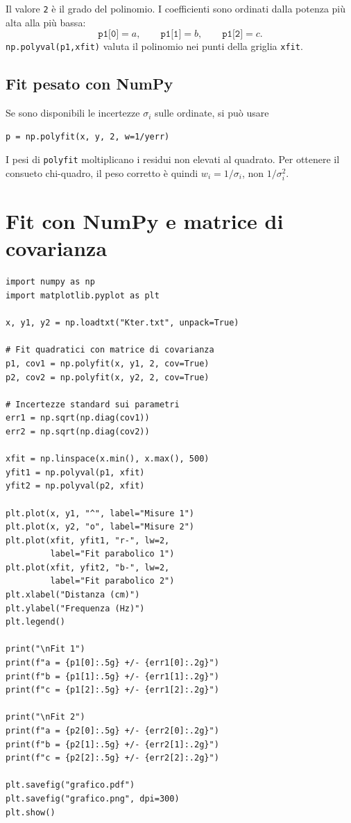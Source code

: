 \documentclass[11pt,a4paper]{book}
\begin{document}
Il valore \texttt{2} è il grado del polinomio. I coefficienti sono ordinati dalla potenza più alta alla più bassa:
\[
 \texttt{p1[0]}=a,\qquad
 \texttt{p1[1]}=b,\qquad
 \texttt{p1[2]}=c.
\]
\texttt{np.polyval(p1,xfit)} valuta il polinomio nei punti della griglia \texttt{xfit}.

\subsection{Fit pesato con NumPy}
Se sono disponibili le incertezze $\sigma_i$ sulle ordinate, si può usare
\begin{lstlisting}
p = np.polyfit(x, y, 2, w=1/yerr)
\end{lstlisting}
I pesi di \texttt{polyfit} moltiplicano i residui non elevati al quadrato. Per ottenere il consueto chi-quadro, il peso corretto è quindi $w_i=1/\sigma_i$, non $1/\sigma_i^2$.

\section{Fit con NumPy e matrice di covarianza}
\begin{lstlisting}
import numpy as np
import matplotlib.pyplot as plt

x, y1, y2 = np.loadtxt("Kter.txt", unpack=True)

# Fit quadratici con matrice di covarianza
p1, cov1 = np.polyfit(x, y1, 2, cov=True)
p2, cov2 = np.polyfit(x, y2, 2, cov=True)

# Incertezze standard sui parametri
err1 = np.sqrt(np.diag(cov1))
err2 = np.sqrt(np.diag(cov2))

xfit = np.linspace(x.min(), x.max(), 500)
yfit1 = np.polyval(p1, xfit)
yfit2 = np.polyval(p2, xfit)

plt.plot(x, y1, "^", label="Misure 1")
plt.plot(x, y2, "o", label="Misure 2")
plt.plot(xfit, yfit1, "r-", lw=2,
         label="Fit parabolico 1")
plt.plot(xfit, yfit2, "b-", lw=2,
         label="Fit parabolico 2")
plt.xlabel("Distanza (cm)")
plt.ylabel("Frequenza (Hz)")
plt.legend()

print("\nFit 1")
print(f"a = {p1[0]:.5g} +/- {err1[0]:.2g}")
print(f"b = {p1[1]:.5g} +/- {err1[1]:.2g}")
print(f"c = {p1[2]:.5g} +/- {err1[2]:.2g}")

print("\nFit 2")
print(f"a = {p2[0]:.5g} +/- {err2[0]:.2g}")
print(f"b = {p2[1]:.5g} +/- {err2[1]:.2g}")
print(f"c = {p2[2]:.5g} +/- {err2[2]:.2g}")

plt.savefig("grafico.pdf")
plt.savefig("grafico.png", dpi=300)
plt.show()
\end{lstlisting}
\end{document}
